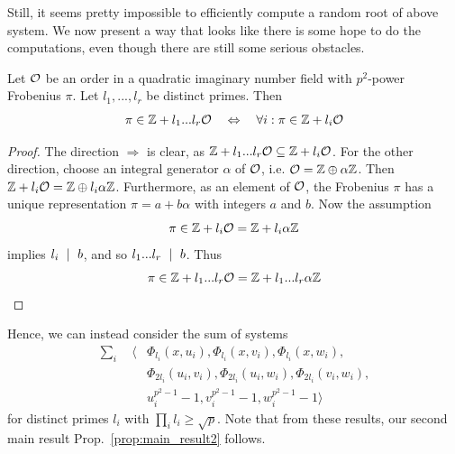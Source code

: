 Still, it seems pretty impossible to efficiently compute a random root of above system.
We now present a way that looks like there is some hope to do the computations, even though there are still some serious obstacles.
\begin{prop}
    Let $\mathcal{O}$ be an order in a quadratic imaginary number field with $p^2$-power Frobenius $\pi$.
    Let $l_1, ..., l_r$ be distinct primes.
    Then
    \begin{equation*}
        \pi \in \mathbb{Z} + l_1 ... l_r \mathcal{O} \quad \Leftrightarrow \quad \forall i: \pi \in \mathbb{Z} + l_i \mathcal{O}
    \end{equation*}
\end{prop}
\begin{proof}
    The direction $\Rightarrow$ is clear, as $\mathbb{Z} + l_1 ... l_r \mathcal{O} \subseteq \mathbb{Z} + l_i\mathcal{O}$.
    For the other direction, choose an integral generator $\alpha$ of $\mathcal{O}$, i.e. $\mathcal{O} = \mathbb{Z} \oplus \alpha\mathbb{Z}$.
    Then $\mathbb{Z} + l_i\mathcal{O} = \mathbb{Z} \oplus l_i\alpha\mathbb{Z}$.
    Furthermore, as an element of $\mathcal{O}$, the Frobenius $\pi$ has a unique representation $\pi = a + b\alpha$ with integers $a$ and $b$.
    Now the assumption
    \begin{equation*}
        \pi \in \mathbb{Z} + l_i\mathcal{O} = \mathbb{Z} + l_i\alpha\mathbb{Z}
    \end{equation*}
    implies $l_i \ \mid \  b$, and so $l_1 ... l_r \ \mid \  b$.
    Thus
    \begin{equation*}
        \pi \in \mathbb{Z} + l_1 ... l_r \mathcal{O} = \mathbb{Z} + l_1 ... l_r \alpha \mathbb{Z} \qedhere
    \end{equation*}
\end{proof}
Hence, we can instead consider the sum of systems
\begin{align*}
    \sum_i \quad \langle &\Phi_{l_i}(x, u_i), \Phi_{l_i}(x, v_i), \Phi_{l_i}(x, w_i), \\
    &\Phi_{2l_i}(u_i, v_i), \Phi_{2l_i}(u_i, w_i), \Phi_{2l_i}(v_i, w_i), \\
    &u_i^{p^2 - 1} - 1, v_i^{p^2 - 1} - 1, w_i^{p^2 - 1} - 1 \rangle 
\end{align*}
for distinct primes $l_i$ with $\prod_i l_i \geq \sqrt{p}$.
Note that from these results, our second main result Prop.~\ref{prop:main_result2} follows.

